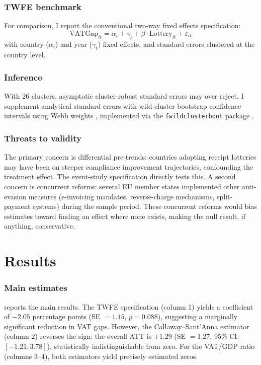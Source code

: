 \documentclass[12pt]{article}
\begin{document}
\subsubsection*{TWFE benchmark} For comparison, I report the conventional two-way fixed effects specification:
\begin{equation}
\text{VATGap}_{it} = \alpha_i + \gamma_t + \beta \cdot \text{Lottery}_{it} + \varepsilon_{it}
\end{equation}
with country ($\alpha_i$) and year ($\gamma_t$) fixed effects, and standard errors clustered at the country level.

\subsubsection*{Inference} With 26 clusters, asymptotic cluster-robust standard errors may over-reject. I supplement analytical standard errors with wild cluster bootstrap confidence intervals using Webb weights \citep{webb2014, mackinnon2022}, implemented via the \texttt{fwildclusterboot} package \citep{fischer2021}.

\subsubsection*{Threats to validity} The primary concern is differential pre-trends: countries adopting receipt lotteries may have been on steeper compliance improvement trajectories, confounding the treatment effect. The event-study specification directly tests this. A second concern is concurrent reforms: several EU member states implemented other anti-evasion measures (e-invoicing mandates, reverse-charge mechanisms, split-payment systems) during the sample period. These concurrent reforms would bias estimates toward finding an effect where none exists, making the null result, if anything, conservative.

\section{Results}
\label{sec:results}



\subsubsection*{Main estimates}  reports the main results. The TWFE specification (column 1) yields a coefficient of $-2.05$ percentage points (SE $= 1.15$, $p = 0.088$), suggesting a marginally significant reduction in VAT gaps. However, the Callaway--Sant'Anna estimator (column 2) reverses the sign: the overall ATT is $+1.29$ (SE $= 1.27$, 95\% CI: $[-1.21, 3.78]$), statistically indistinguishable from zero. For the VAT/GDP ratio (columns 3--4), both estimators yield precisely estimated zeros.
\end{document}
